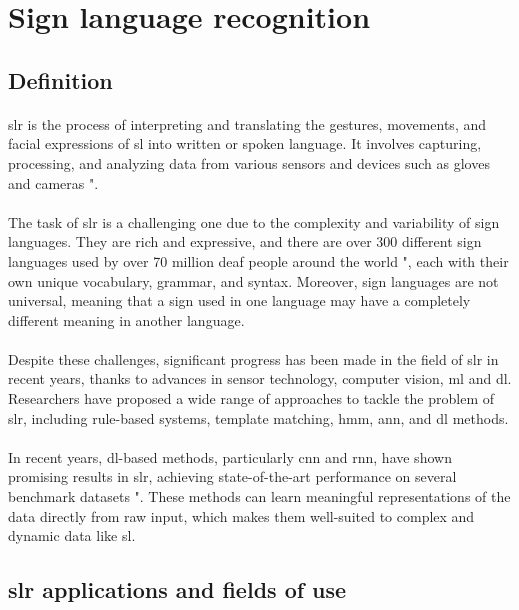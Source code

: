 \section{Sign language recognition}
\subsection{Definition}
\paragraph{}
\ac{slr} is the process of interpreting and translating the gestures, movements, and facial expressions of \ac{sl} into written or spoken language. It involves capturing, processing, and analyzing data from various sensors and devices such as gloves and cameras "\cite{kumar2016sign}.
\paragraph{}
The task of \ac{slr} is a challenging one due to the complexity and variability of sign languages. They are rich and expressive, and there are over 300 different sign languages used by over 70 million deaf people around the world "\cite{rastgoo2021sign}, each with their own unique vocabulary, grammar, and syntax. Moreover, sign languages are not universal, meaning that a sign used in one language may have a completely different meaning in another language.
\paragraph{}
Despite these challenges, significant progress has been made in the field of \ac{slr} in recent years, thanks to advances in sensor technology, computer vision, \ac{ml} and \ac{dl}. Researchers have proposed a wide range of approaches to tackle the problem of \ac{slr}, including rule-based systems, template matching, \ac{hmm}, \ac{ann}, and \ac{dl} methods.
\paragraph{}
In recent years, \ac{dl}-based methods, particularly \ac{cnn} and \ac{rnn}, have shown promising results in \ac{slr}, achieving state-of-the-art performance on several benchmark datasets "\cite{bantupalli2018american}. These methods can learn meaningful representations of the data directly from raw input, which makes them well-suited to complex and dynamic data like \ac{sl}.
\subsection{\ac{slr} applications and fields of use}
